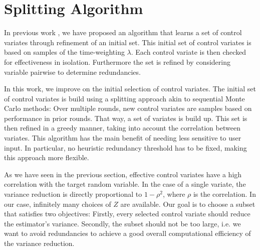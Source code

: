 \section{Splitting Algorithm}\label{sec:splitting}
In previous work \parencite{backenkohler2019control}, we have proposed an algorithm that learns a set of
control variates through refinement of an initial set.
This initial set of control variates is based on samples of the time-weighting $\lambda$.
Each control variate is then checked for effectiveness in isolation.
Furthermore the set is refined by considering variable pairwise to determine redundancies.

In this work, we improve on the initial selection of control variates.
The initial set of control variates is build using a splitting approach akin to sequential Monte Carlo methods:
Over multiple rounds, new control variates are samples based on performance in prior rounds.
That way, a set of variates is build up.
This set is then refined in a greedy manner, taking into account the correlation between variates.
This algorithm has the main benefit of needing less sensitive to user input.
In particular, no heuristic redundancy threshold has to be fixed, making this approach more flexible.

As we have seen in the previous section, effective control variates have a high correlation
with the target random variable.
In the case of a single variate, the variance reduction is directly proportional to $1-\rho^2$, where
$\rho$ is the correlation.
In our case, infinitely many choices of $Z$ are available.
Our goal is to choose a subset that
satisfies two objectives:
Firstly, every selected control variate should reduce the estimator's variance.
Secondly, the subset should not be too large, i.e.  we want to avoid redundancies to achieve 
 a good  overall computational efficiency of the variance reduction.


